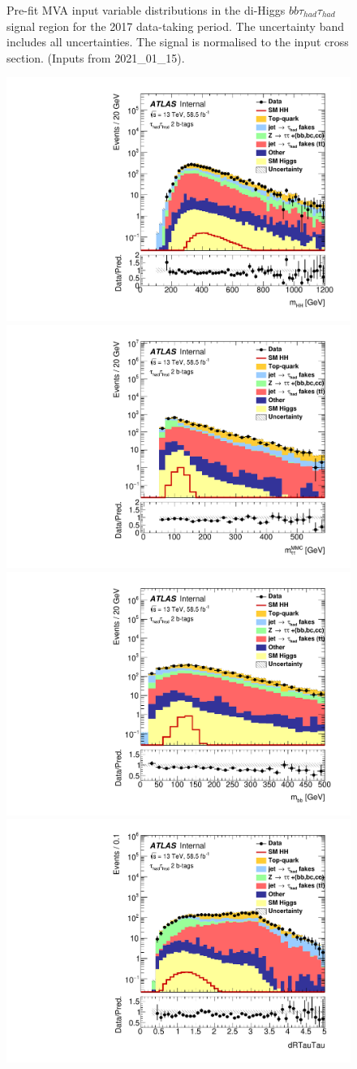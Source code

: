 \begin{figure}
\caption{Pre-fit MVA input variable distributions in the di-Higgs
  $bb\tau_{had}\tau_{had}$ signal region for the 2017 data-taking period. The uncertainty band includes all uncertainties. The signal is normalised to the input cross section. (Inputs from 2021\_01\_15).}
\label{fig:HadHadPreselectionPNNInputsDistributions2017}
\end{figure}


\begin{figure}
\centering
\includegraphics[width=.45\textwidth]{figures/selection/HadHad_HH/Plots2018/Region_BMin0_incJet1_distmHH_J2_Y2015_DLLOS_T2_SpcTauHH_L0_Prefitlog.pdf}
\includegraphics[width=.45\textwidth]{figures/selection/HadHad_HH/Plots2018/Region_BMin0_incJet1_distmMMC_J2_Y2015_DLLOS_T2_SpcTauHH_L0_Prefitlog.pdf}\\
\includegraphics[width=.45\textwidth]{figures/selection/HadHad_HH/Plots2018/Region_BMin0_incJet1_distmBB_J2_Y2015_DLLOS_T2_SpcTauHH_L0_Prefitlog.pdf}
\includegraphics[width=.45\textwidth]{figures/selection/HadHad_HH/Plots2018/Region_BMin0_incJet1_distdRTauTau_J2_Y2015_DLLOS_T2_SpcTauHH_L0_Prefitlog.pdf}\\

\end{figure}

